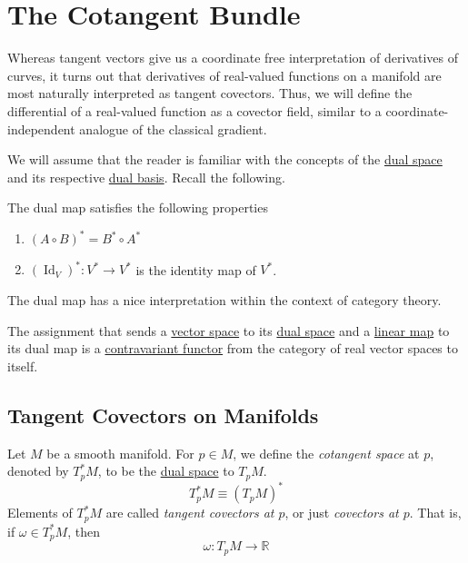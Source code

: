 \documentclass{article}
\DeclareMathOperator{\Id}{Id}
\newcounter{theorem}[section]
\newcounter{definition}[section]
\begin{document}
\section{The Cotangent Bundle}

  Whereas tangent vectors give us a coordinate free interpretation of derivatives of curves, it turns out that derivatives of real-valued functions on a manifold are most naturally interpreted as tangent covectors. Thus, we will define the differential of a real-valued function as a covector field, similar to a coordinate-independent analogue of the classical gradient. 

  We will assume that the reader is familiar with the concepts of the \hyperref[lin-def:dual-space]{dual space} and its respective \hyperref[lin-def:dual-basis]{dual basis}. Recall the following. 

  \begin{theorem}
    \label{thm:functorial-properties-of-the-dual-map}
  The dual map satisfies the following properties 
  \begin{enumerate}
      \item $(A \circ B)^* = B^* \circ A^*$
      \item $(\Id_V)^*: V^* \to V^*$ is the identity map of $V^*$. 
  \end{enumerate}
  \end{theorem}

  The dual map has a nice interpretation within the context of category theory.

  \begin{corollary}
    \label{thm:dualization-is-a-contravariant-functor}
  The assignment that sends a \hyperref[lin-def:vector-space]{vector space} to its \hyperref[lin-def:dual-space]{dual space} and a \hyperref[lin-def:linear_map]{linear map} to its dual map is a \hyperref[def:contravariant-functor]{contravariant functor} from the category of real vector spaces to itself. 
  \end{corollary}

  \subsection{Tangent Covectors on Manifolds}

    \begin{definition}
      \label{def:cotangent-space}
    Let $M$ be a smooth manifold. For $p \in M$, we define the \textit{cotangent space} at $p$, denoted by $T_p^* M$, to be the \hyperref[lin-def:dual-space]{dual space} to $T_p M$. 
    \begin{equation}
      T_p^* M \equiv (T_p M)^*
    \end{equation}
    Elements of $T_p^* M$ are called \textit{tangent covectors at $p$}, or just \textit{covectors at $p$}. That is, if $\omega \in T_p^* M$, then 
    \begin{equation}
      \omega: T_p M \to \mathbb{R}
    \end{equation}
    \end{definition}
\end{document}
